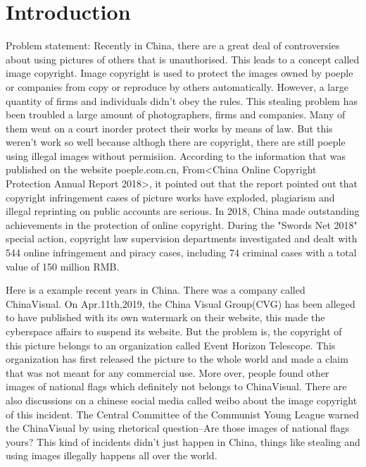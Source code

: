 \section{Introduction}
Problem statement:
Recently in China, 
there are a great deal of controversies about using pictures of others that is unauthorised.
This leads to a concept called image copyright.
Image copyright is used to protect the images owned by poeple or companies from copy or reproduce by others automatically. %
However, a large quantity of firms and individuals didn't obey the rules.
This stealing problem has been troubled a large amount of photographers, firms and companies.
Many of them went on a court inorder protect their works by means of law.
But this weren't work so well because althogh there are copyright, 
there are still poeple using illegal images  without permisiion.
According to the information that was published on the website poeple.com.cn,
From<China Online Copyright Protection Annual Report 2018>, 
it pointed out that the report pointed out that copyright infringement cases of picture works have exploded, 
plagiarism and illegal reprinting on public accounts are serious.
In 2018, China made outstanding achievements in the protection of online copyright. 
During the "Swords Net 2018" special action, copyright law supervision departments investigated and dealt with 544 online infringement and piracy cases, 
including 74 criminal cases with a total value of 150 million RMB.

Here is a example recent years in China.
There was a company called ChinaVisual.
On Apr.11th,2019, 
the China Visual Group(CVG) has been alleged to have published with its own watermark on their website, 
this made the cyberspace affairs to suspend its website.
But the problem is, the copyright of this picture belongs to an organization called Event Horizon Telescope. 
This organization has first released the picture to the whole world and made a claim that was not meant for any commercial use.
More over, people found other images of national flags which definitely not belongs to ChinaVisual.
There are also discussions on a chinese social media called weibo about the image copyright of this incident. 
The Central Committee of the Communist Young League warned the ChinaVisual by using rhetorical question--Are those images of national flags yours?
This kind of incidents didn't just happen in China, things like stealing and using images illegally happens all over the world.


